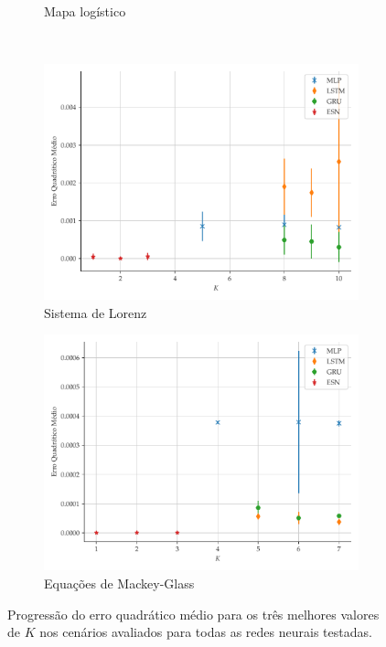 \documentclass[a4paper, 12pt]{article}
\begin{document}
\begin{figure}[!ht]
\begin{subfigure}[t]{0.49\textwidth}
         \caption{Mapa logístico}
     \end{subfigure}
     \\
     \centering
     \begin{subfigure}[t]{0.49\textwidth}
     \centering
         \includegraphics[scale=0.45]{lorenz-3best.pdf}
         \caption{Sistema de Lorenz}
     \end{subfigure}
     \centering
     \begin{subfigure}[t]{0.49\textwidth} 
     \centering
         \includegraphics[scale=0.45]{mackeyglass-3best.pdf}
         \caption{Equações de Mackey-Glass}
     \end{subfigure}  
     \centering   
     \caption{Progressão do erro quadrático médio para os três melhores valores de $K$ nos cenários avaliados para todas as redes neurais testadas.}
     \label{fig:mse-progression-3best}
\end{figure}
\end{document}
